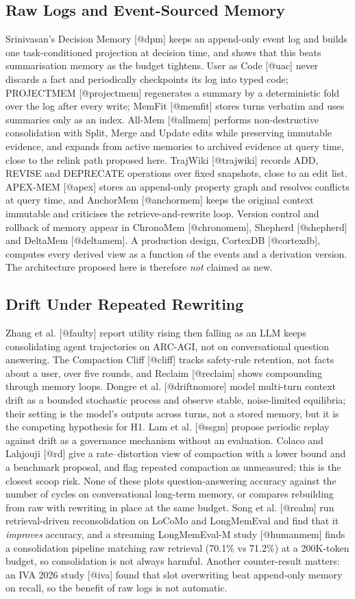 \subsection{Raw Logs and Event-Sourced Memory}
Srinivasan's Decision Memory [@dpm] keeps an append-only event log and builds one task-conditioned projection at decision time, and shows that this beats summarisation memory as the budget tightens. User as Code [@uac] never discards a fact and periodically checkpoints its log into typed code; PROJECTMEM [@projectmem] regenerates a summary by a deterministic fold over the log after every write; MemFit [@memfit] stores turns verbatim and uses summaries only as an index. All-Mem [@allmem] performs non-destructive consolidation with Split, Merge and Update edits while preserving immutable evidence, and expands from active memories to archived evidence at query time, close to the relink path proposed here. TrajWiki [@trajwiki] records ADD, REVISE and DEPRECATE operations over fixed snapshots, close to an edit list. APEX-MEM [@apex] stores an append-only property graph and resolves conflicts at query time, and AnchorMem [@anchormem] keeps the original context immutable and criticises the retrieve-and-rewrite loop. Version control and rollback of memory appear in ChronoMem [@chronomem], Shepherd [@shepherd] and DeltaMem [@deltamem]. A production design, CortexDB [@cortexdb], computes every derived view as a function of the events and a derivation version. The architecture proposed here is therefore \textit{not} claimed as new.

\subsection{Drift Under Repeated Rewriting}
Zhang et al. [@faulty] report utility rising then falling as an LLM keeps consolidating agent trajectories on ARC-AGI, not on conversational question answering. The Compaction Cliff [@cliff] tracks safety-rule retention, not facts about a user, over five rounds, and Reclaim [@reclaim] shows compounding through memory loops. Dongre et al. [@driftnomore] model multi-turn context drift as a bounded stochastic process and observe stable, noise-limited equilibria; their setting is the model's outputs across turns, not a stored memory, but it is the competing hypothesis for H1. Lam et al. [@ssgm] propose periodic replay against drift as a governance mechanism without an evaluation. Colaco and Lahjouji [@rd] give a rate--distortion view of compaction with a lower bound and a benchmark proposal, and flag repeated compaction as unmeasured; this is the closest scoop risk. None of these plots question-answering accuracy against the number of cycles on conversational long-term memory, or compares rebuilding from raw with rewriting in place at the same budget. Song et al. [@realm] run retrieval-driven reconsolidation on LoCoMo and LongMemEval and find that it \textit{improves} accuracy, and a streaming LongMemEval-M study [@humanmem] finds a consolidation pipeline matching raw retrieval (70.1\% vs 71.2\%) at a 200K-token budget, so consolidation is not always harmful. Another counter-result matters: an IVA 2026 study [@iva] found that slot overwriting beat append-only memory on recall, so the benefit of raw logs is not automatic.


